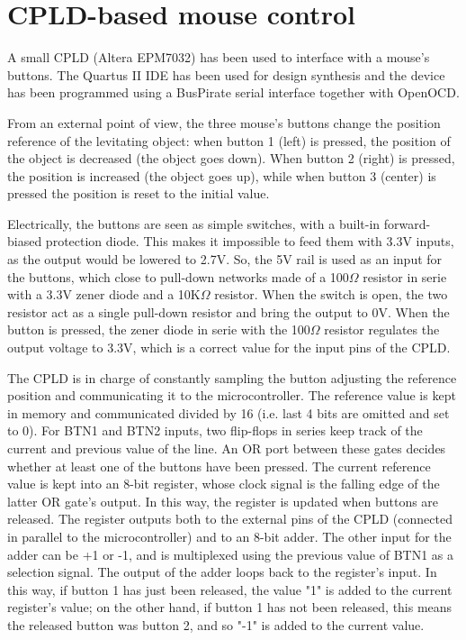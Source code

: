 \section{CPLD-based mouse control}
A small CPLD (Altera EPM7032) has been used to interface with a mouse's buttons. The Quartus II IDE has been used for design synthesis and the device has been programmed using a BusPirate serial interface together with OpenOCD.

From an external point of view, the three mouse's buttons change the position reference of the levitating object: when button 1 (left) is pressed, the position of the object is decreased (the object goes down). When button 2 (right) is pressed, the position is increased (the object goes up), while when button 3 (center) is pressed the position is reset to the initial value.

Electrically, the buttons are seen as simple switches, with a built-in forward-biased protection diode. This makes it impossible to feed them with 3.3V inputs, as the output would be lowered to 2.7V. So, the 5V rail is used as an input for the buttons, which close to pull-down networks made of a 100$\Omega$ resistor in serie with a 3.3V zener diode and a 10K$\Omega$ resistor. When the switch is open, the two resistor act as a single pull-down resistor and bring the output to 0V. When the button is pressed, the zener diode in serie with the 100$\Omega$ resistor regulates the output voltage to 3.3V, which is a correct value for the input pins of the CPLD.

The CPLD is in charge of constantly sampling the button adjusting the reference position and communicating it to the microcontroller. The reference value is kept in memory and communicated divided by 16 (i.e. last 4 bits are omitted and set to 0). For BTN1 and BTN2 inputs, two flip-flops in series keep track of the current and previous value of the line. An OR port between these gates decides whether at least one of the buttons have been pressed. The current reference value is kept into an 8-bit register, whose clock signal is the falling edge of the latter OR gate's output. In this way, the register is updated when buttons are released. The register outputs both to the external pins of the CPLD (connected in parallel to the microcontroller) and to an 8-bit adder. The other input for the adder can be +1 or -1, and is multiplexed using the previous value of BTN1 as a selection signal. The output of the adder loops back to the register's input. In this way, if button 1 has just been released, the value "1" is added to the current register's value; on the other hand, if button 1 has not been released, this means the released button was button 2, and so "-1" is added to the current value.

